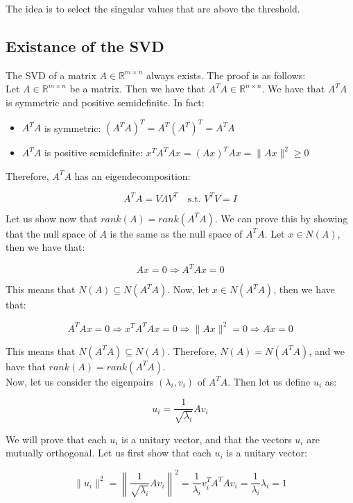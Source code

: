 The idea is to select the singular values that are above the threshold.

\subsection{Existance of the SVD}

The SVD of a matrix $A \in \mathbb{R}^{m \times n}$ always exists. The proof is as follows:\\

Let $A \in \mathbb{R}^{m \times n}$ be a matrix. Then we have that $A^T A \in \mathbb{R}^{n \times n}$.
We have that $A^T A$ is symmetric and positive semidefinite. In fact:

\begin{itemize}
    \item $A^T A$ is symmetric: $(A^T A)^T = A^T (A^T)^T = A^T A$
    \item $A^T A$ is positive semidefinite: $x^T A^T A x = (A x)^T A x = \|A x\|^2 \geq 0$
\end{itemize}

Therefore, $A^T A$ has an eigendecomposition:

$$A^T A = V \Lambda V^T \quad \text{s.t. } V^T V = I$$

Let us show now that $rank(A) = rank(A^T A)$. We can prove this by showing that the null space of $A$ 
is the same as the null space of $A^T A$. Let $x \in N(A)$, then we have that:

$$A x = 0 \Rightarrow A^T A x = 0$$

This means that $N(A) \subseteq N(A^T A)$. Now, let $x \in N(A^T A)$, then we have that:

$$A^T A x = 0 \Rightarrow x^T A^T A x = 0 \Rightarrow \|A x\|^2 = 0 \Rightarrow A x = 0$$

This means that $N(A^T A) \subseteq N(A)$. Therefore, $N(A) = N(A^T A)$, and we have 
that $rank(A) = rank(A^T A)$.\\

Now, let us consider the eigenpairs $(\lambda_i, v_i)$ of $A^T A$. Then let us define $u_i$ as:

$$u_i = \frac{1}{\sqrt{\lambda_i}} A v_i$$

We will prove that each $u_i$ is a unitary vector, and that the vectors $u_i$ are mutually orthogonal. 
Let us first show that each $u_i$ is a unitary vector:

$$\|u_i\|^2 = \left\| \frac{1}{\sqrt{\lambda_i}} A v_i \right\|^2 = \frac{1}{\lambda_i} v_i^T A^T A v_i = \frac{1}{\lambda_i} \lambda_i = 1$$

